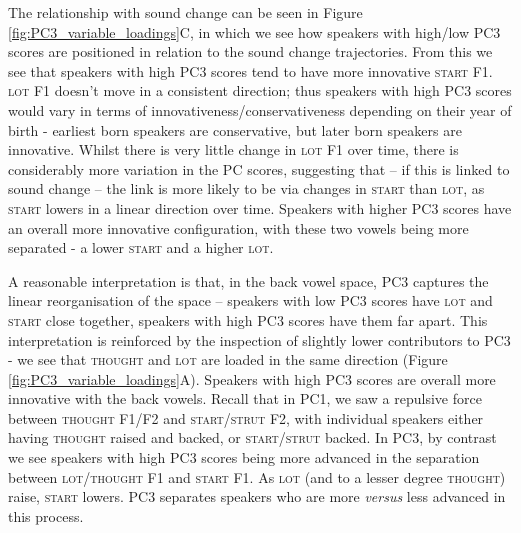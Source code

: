 \documentclass[review]{elsarticle} %
\begin{document}
The relationship with sound change can be seen in Figure \ref{fig:PC3_variable_loadings}C, in which we see how speakers with high/low PC3 scores are positioned in relation to the sound change trajectories. From this we see that speakers with high PC3 scores tend to have more innovative \textsc{start} F1.  \textsc{lot} F1 doesn't move in a consistent direction; thus speakers with high PC3 scores would vary in terms of innovativeness/conservativeness depending on their year of birth - earliest born speakers are conservative, but later born speakers are innovative. Whilst there is very little change in \textsc{lot} F1 over time, there is considerably more variation in the PC scores, suggesting that -- if this is linked to sound change -- the link is more likely to be via changes in \textsc{start} than \textsc{lot}, as \textsc{start} lowers in a linear direction over time.  Speakers with higher PC3 scores have an overall more innovative configuration, with these two vowels being more separated - a lower \textsc{start} and a higher \textsc{lot}.

A reasonable interpretation is that, in the back vowel space, PC3 captures the linear reorganisation of the space -- speakers with low PC3 scores have  \textsc{lot} and \textsc{start} close together, speakers with high PC3 scores have them far apart. This interpretation is reinforced by the inspection of slightly lower contributors to PC3 - we see that  \textsc{thought} and  \textsc{lot} are loaded in the same direction (Figure \ref{fig:PC3_variable_loadings}A). Speakers with high PC3 scores are overall more innovative with the back vowels. Recall that in PC1, we saw a repulsive force between \textsc{thought} F1/F2 and \textsc{start/strut} F2, with individual speakers either having \textsc{thought} raised and backed, or \textsc{start/strut} backed.  In PC3, by contrast we see speakers with high PC3 scores being more advanced in the separation between \textsc{lot/thought} F1 and \textsc{start} F1.  As \textsc{lot} (and to a lesser degree \textsc{thought}) raise, \textsc{start} lowers.  PC3 separates speakers who are more \textit{versus} less advanced in this process.

\end{document}
